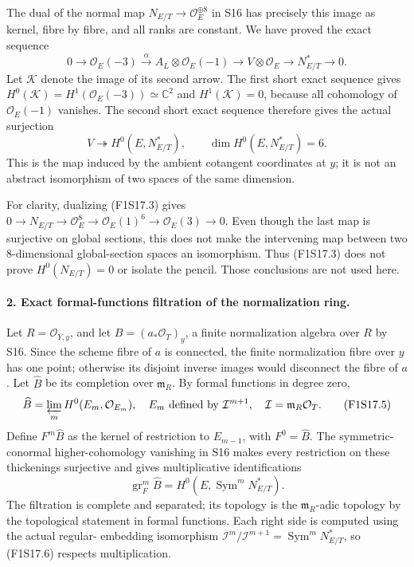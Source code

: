 The dual of the normal map $N_{E/T}\to\mathcal O_E^{\oplus8}$ in S16
has precisely this image as kernel, fibre by fibre, and all ranks are
constant. We have proved the exact sequence
\[
 0\longrightarrow\mathcal O_E(-3)
 \xrightarrow{\alpha} A_L\otimes\mathcal O_E(-1)
 \longrightarrow V\otimes\mathcal O_E
 \longrightarrow N^*_{E/T}\longrightarrow0.
 \tag{F1S17.3}
\]
Let $\mathcal K$ denote the image of its second arrow. The first short
exact sequence gives
$H^0(\mathcal K)=H^1(\mathcal O_E(-3))\simeq\mathbb C^2$ and
$H^1(\mathcal K)=0$, because all cohomology of $\mathcal O_E(-1)$
vanishes. The second short exact sequence therefore gives the actual
surjection
\[
                    V\twoheadrightarrow H^0(E,N^*_{E/T}),
              \qquad \dim H^0(E,N^*_{E/T})=6.
 \tag{F1S17.4}
\]
This is the map induced by the ambient cotangent coordinates at $y$;
it is not an abstract isomorphism of two spaces of the same dimension.

For clarity, dualizing (F1S17.3) gives
$0\to N_{E/T}\to\mathcal O_E^8\to\mathcal O_E(1)^6\to
\mathcal O_E(3)\to0$. Even though the last map is surjective on global
sections, this does not make the intervening map between two
8-dimensional global-section spaces an isomorphism. Thus (F1S17.3)
does not prove $H^0(N_{E/T})=0$ or isolate the pencil. Those conclusions
are not used here.

\paragraph{2. Exact formal-functions filtration of the normalization ring.}
Let $R=\mathcal O_{Y,y}$, and let $B=(a_*\mathcal O_T)_y$, a finite
normalization algebra over $R$ by S16. Since the scheme fibre of $a$
is connected, the finite normalization fibre over $y$ has one point;
otherwise its disjoint inverse images would disconnect the fibre of
$a$. Let $\widehat B$ be its completion over $\mathfrak m_R$.
By formal functions in degree zero,
\[
       \widehat B=\varprojlim_m H^0(E_m,\mathcal O_{E_m}),
 \quad E_m\text{ defined by }\mathcal I^{m+1},
 \quad\mathcal I=\mathfrak m_R\mathcal O_T.
 \tag{F1S17.5}
\]
Define $F^m\widehat B$ as the kernel of restriction to $E_{m-1}$,
with $F^0=\widehat B$. The symmetric-conormal higher-cohomology
vanishing in S16 makes every restriction on these thickenings
surjective and gives multiplicative identifications
\[
 \operatorname{gr}_F^m\widehat B
                    =H^0(E,\operatorname{Sym}^mN^*_{E/T}).
 \tag{F1S17.6}
\]
The filtration is complete and separated; its topology is the
$\mathfrak m_R$-adic topology by the topological statement in formal
functions. Each right side is computed using the actual regular-
embedding isomorphism $\mathcal I^m/\mathcal I^{m+1}=
\operatorname{Sym}^mN^*_{E/T}$, so (F1S17.6) respects multiplication.


